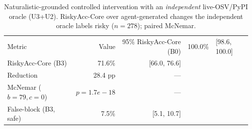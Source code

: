 \begin{table}[t]\centering
\caption{Naturalistic-grounded controlled intervention with an \emph{independent} live-OSV/PyPI oracle (U3+U2). RiskyAcc-Core over agent-generated changes the independent oracle labels risky ($n=278$); paired McNemar.}
\label{tab:e1a-indep}
\begin{tabular}{lrr}
\toprule
Metric & Value & 95\%%
\midrule
RiskyAcc-Core (B0) & 100.0\% & [98.6, 100.0] \\
RiskyAcc-Core (B3) & 71.6\% & [66.0, 76.6] \\
Reduction & 28.4 pp & --- \\
McNemar ($b{=}79,c{=}0$) & $p{=}1.7e-18$ & --- \\
False-block (B3, safe) & 7.5\% & [5.1, 10.7] \\
\bottomrule
\end{tabular}
\end{table}
